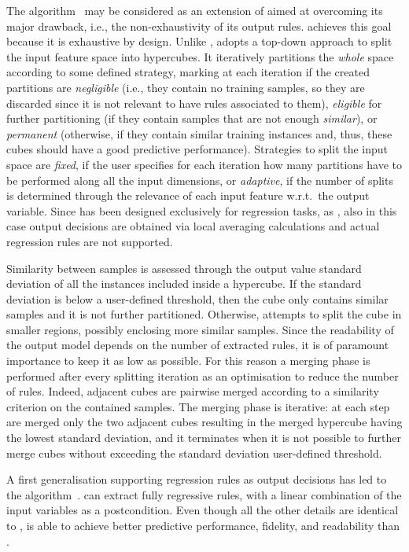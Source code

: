 \documentclass[
]{ceurart}
\begin{document}
The \gridex{} algorithm~\cite{gridex-extraamas2021} may be considered as an extension of \iter{} aimed at overcoming its major drawback, i.e., the non-exhaustivity of its output rules.
%
\gridex{} achieves this goal because it is exhaustive by design.
%
Unlike \iter{}, \gridex{} adopts a top-down approach to split the input feature space into hypercubes.
%
It iteratively partitions the \emph{whole} space according to some defined strategy, marking at each iteration if the created partitions are \emph{negligible} (i.e., they contain no training samples, so they are discarded since it is not relevant to have rules associated to them), \emph{eligible} for further partitioning (if they contain samples that are not enough \emph{similar}), or \emph{permanent} (otherwise, if they contain similar training instances and, thus, these cubes should have a good predictive performance).
%
Strategies to split the input space are \emph{fixed}, if the user specifies for each iteration how many partitions have to be performed along all the input dimensions, or \emph{adaptive}, if the number of splits is determined through the relevance of each input feature w.r.t.\ the output variable.
%
Since \gridex{} has been designed exclusively for regression tasks, as \iter{}, also in this case output decisions are obtained via local averaging calculations and actual regression rules are not supported.

Similarity between samples is assessed through the output value standard deviation of all the instances included inside a hypercube.
%
If the standard deviation is below a user-defined threshold, then the cube only contains similar samples and it is not further partitioned.
%
Otherwise, \gridex{} attempts to split the cube in smaller regions, possibly enclosing more similar samples.
%
Since the readability of the output model depends on the number of extracted rules, it is of paramount importance to keep it as low as possible.
%
For this reason a merging phase is performed after every splitting iteration as an optimisation to reduce the number of rules.
%
Indeed, adjacent cubes are pairwise merged according to a similarity criterion on the contained samples.
%
The merging phase is iterative: at each step are merged only the two adjacent cubes resulting in the merged hypercube having the lowest standard deviation, and it terminates when it is not possible to further merge cubes without exceeding the standard deviation user-defined threshold.

A first \gridex{} generalisation supporting regression rules as output decisions has led to the \gridrex{} algorithm~\cite{gridrex-kr2022}.
%
\gridrex{} can extract fully regressive rules, with a linear combination of the input variables as a postcondition.
%
Even though all the other details are identical to \gridex{}, \gridrex{} is able to achieve better predictive performance, fidelity, and readability than \gridex{}.
\end{document}
